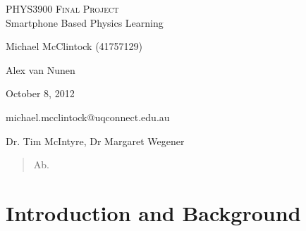 \documentclass[12pt,a4paper]{article}  %
\begin{document}
\begin{titlepage}
\begin{center}
\textsc{\LARGE PHYS3900 Final Project}\\[1cm]
{\LARGE Smartphone Based Physics Learning}\\[2cm]
\begin{minipage}[t]{0.6\columnwidth} \large
\begin{description}
\itemsep2mm
\small
\item [\emph{Author:}] Michael McClintock (41757129)
\item [\emph{Partner:}] Alex van Nunen
\item [\emph{Date:}] October 8, 2012
\item [\emph{Email:}] michael.mcclintock@uqconnect.edu.au
\item [\emph{Supervisors:}] Dr. Tim McIntyre, Dr Margaret Wegener
\end{description}
\end{minipage}
\vfill
\end{center}
\end{titlepage}

\begin{abstract}
Ab.
\end{abstract}
\thispagestyle{empty}
\newpage

\tableofcontents
\thispagestyle{empty}
\newpage
\setcounter{page}{1}

\section{Introduction and Background}


\end{document}
